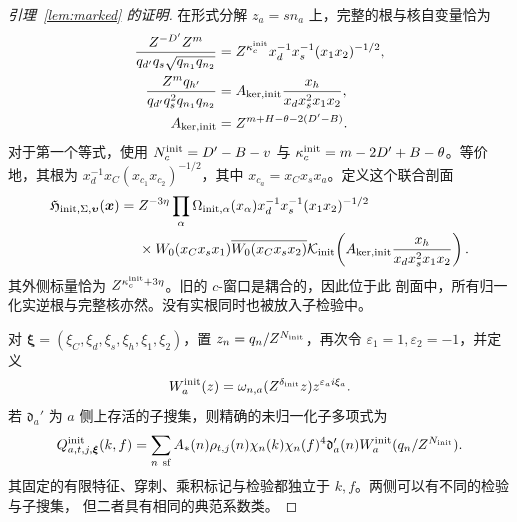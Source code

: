 \documentclass[11pt,a4paper]{article}
\numberwithin{equation}{section}
\numberwithin{figure}{section}
\theoremstyle{definition}
\theoremstyle{remark}
\begin{document}
\begin{proof}[引理~\ref{lem:marked} 的证明]
在形式分解 \(z_a=sn_a\) 上，完整的根与核自变量恰为
\begin{equation}\label{eq:initial-root-kernel}
 \begin{split}
 \frac{Z^{-D'}Z^m}{q_{d'}q_s\sqrt{q_{n_1}q_{n_2}}}
 &=Z^{\kappa_c^{\rm init}}x_d^{-1}x_s^{-1}(x_1x_2)^{-1/2},\\
 \frac{Z^mq_{h'}}{q_{d'}q_s^2q_{n_1}q_{n_2}}
 &=A_{{\rm ker},{\rm init}}\frac{x_h}{x_dx_s^2x_1x_2},\\
 A_{{\rm ker},{\rm init}}&=Z^{m+H-\theta-2(D'-B)}.
 \end{split}
\end{equation}
对于第一个等式，使用 \(N_c^{\rm init}=D'-B-v\) 与
\(\kappa_c^{\rm init}=m-2D'+B-\theta\)。等价地，其根为
\(x_d^{-1}x_C(x_{c_1}x_{c_2})^{-1/2}\)，其中 \(x_{c_a}=x_Cx_sx_a\)。定义这个联合剖面
\begin{equation}\label{eq:initial-joint-profile}
 \begin{split}
 \mathfrak H_{{\rm init},\Sigma,\boldsymbol\upsilon}(\boldsymbol x)
 ={}&Z^{-3\eta}\prod_\alpha\Omega_{{\rm init},\alpha}(x_\alpha)
 x_d^{-1}x_s^{-1}(x_1x_2)^{-1/2}\\
 &\times W_0(x_Cx_sx_1)\overline{W_0(x_Cx_sx_2)}
 \mathcal K_{\rm init}\!\left(
 A_{{\rm ker},{\rm init}}\frac{x_h}{x_dx_s^2x_1x_2}\right).
 \end{split}
\end{equation}
其外侧标量恰为 \(Z^{\kappa_c^{\rm init}+3\eta}\)。旧的 \(c\)-窗口是耦合的，因此位于此
剖面中，所有归一化实逆根与完整核亦然。没有实根同时也被放入子检验中。

对 \(\boldsymbol\xi=(\xi_C,\xi_d,\xi_s,\xi_h,\xi_1,\xi_2)\)，置
\(z_n=q_n/Z^{N_{\rm init}}\)，再次令 \(\varepsilon_1=1,\varepsilon_2=-1\)，并定义
\[
 W_a^{\rm init}(z)=\omega_{n,a}(Z^{\delta_{\rm init}}z)
                       z^{\varepsilon_a i\xi_a}.
\]
若 \(\mathfrak d_a'\) 为 \(a\) 侧上存活的子搜集，则精确的未归一化子多项式为
\begin{equation}\label{eq:initial-child-polynomial}
 Q^{\rm init}_{a,t,j,\boldsymbol\xi}(k,f)
 =\sum_{n\ {\rm sf}}A_*(n)\rho_{t,j}(n)
 \chi_n(k)\chi_n(f)^4\mathfrak d_a'(n)
 W_a^{\rm init}(q_n/Z^{N_{\rm init}}).
\end{equation}
其固定的有限特征、穿刺、乘积标记与检验都独立于 \(k,f\)。两侧可以有不同的检验与子搜集，
但二者具有相同的典范系数类。


\end{proof}
\end{document}
